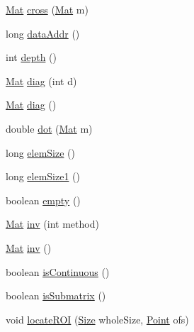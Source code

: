 \begin{DoxyCompactItemize}
\item 
\mbox{\hyperlink{classorg_1_1opencv_1_1core_1_1_mat}{Mat}} \mbox{\hyperlink{classorg_1_1opencv_1_1core_1_1_mat_a830b2d8626fe668db82180adf69e6145}{cross}} (\mbox{\hyperlink{classorg_1_1opencv_1_1core_1_1_mat}{Mat}} m)
\item 
long \mbox{\hyperlink{classorg_1_1opencv_1_1core_1_1_mat_a3b5dcff6ae75137a18cd781454b1129a}{data\+Addr}} ()
\item 
int \mbox{\hyperlink{classorg_1_1opencv_1_1core_1_1_mat_a9bf4679d10841047167676cde239a5b9}{depth}} ()
\item 
\mbox{\hyperlink{classorg_1_1opencv_1_1core_1_1_mat}{Mat}} \mbox{\hyperlink{classorg_1_1opencv_1_1core_1_1_mat_aa28ea6e2ec65861e30319e443dbde298}{diag}} (int d)
\item 
\mbox{\hyperlink{classorg_1_1opencv_1_1core_1_1_mat}{Mat}} \mbox{\hyperlink{classorg_1_1opencv_1_1core_1_1_mat_a46c17fd51fa6344e2081006c1a98b4d8}{diag}} ()
\item 
double \mbox{\hyperlink{classorg_1_1opencv_1_1core_1_1_mat_a053eb46b103c30891659945a6434c5db}{dot}} (\mbox{\hyperlink{classorg_1_1opencv_1_1core_1_1_mat}{Mat}} m)
\item 
long \mbox{\hyperlink{classorg_1_1opencv_1_1core_1_1_mat_aefa109235b149088d48188cb54b891e9}{elem\+Size}} ()
\item 
long \mbox{\hyperlink{classorg_1_1opencv_1_1core_1_1_mat_ae174b003b4f0e87a3a1dbf805962b145}{elem\+Size1}} ()
\item 
boolean \mbox{\hyperlink{classorg_1_1opencv_1_1core_1_1_mat_a873fa8cc0d87ffae2b9c9ed94d79ddec}{empty}} ()
\item 
\mbox{\hyperlink{classorg_1_1opencv_1_1core_1_1_mat}{Mat}} \mbox{\hyperlink{classorg_1_1opencv_1_1core_1_1_mat_ae2903c2da88b961ac9a77352577ed655}{inv}} (int method)
\item 
\mbox{\hyperlink{classorg_1_1opencv_1_1core_1_1_mat}{Mat}} \mbox{\hyperlink{classorg_1_1opencv_1_1core_1_1_mat_a3ae81a587a404aa8b3751af8c0763515}{inv}} ()
\item 
boolean \mbox{\hyperlink{classorg_1_1opencv_1_1core_1_1_mat_a0aaf7d8f437a0dbd73d9f9d1534404f1}{is\+Continuous}} ()
\item 
boolean \mbox{\hyperlink{classorg_1_1opencv_1_1core_1_1_mat_a5a8e2cf2e6d2951ba8c939a4c351793a}{is\+Submatrix}} ()
\item 
void \mbox{\hyperlink{classorg_1_1opencv_1_1core_1_1_mat_a51784a0e99c00a52e8be330cf05710f8}{locate\+R\+OI}} (\mbox{\hyperlink{classorg_1_1opencv_1_1core_1_1_size}{Size}} whole\+Size, \mbox{\hyperlink{classorg_1_1opencv_1_1core_1_1_point}{Point}} ofs)

\end{DoxyCompactItemize}
